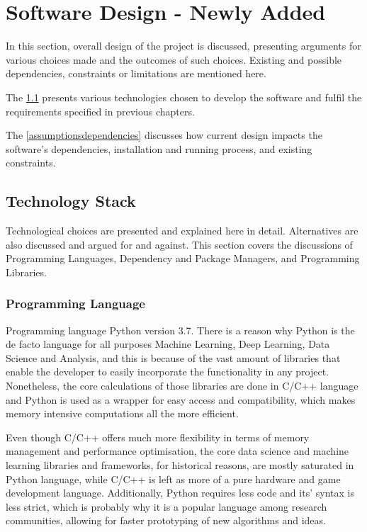 \section{Software Design - Newly Added}
    In this section, overall design of the project is discussed, presenting arguments for various choices made and the outcomes of such choices. Existing and possible dependencies, constraints or limitations are mentioned here.
    
    The \cref{techstack} presents various technologies chosen to develop the software and fulfil the requirements specified in previous chapters.
    
    The \cref{assumptionsdependencies} discusses how current design impacts the software's dependencies, installation and running process, and existing constraints.
    
    \subsection{Technology Stack} \label{techstack}
        Technological choices are presented and explained here in detail. Alternatives are also discussed and argued for and against. This section covers the discussions of Programming Languages, Dependency and Package Managers, and Programming Libraries.
        
        \subsubsection{Programming Language}
            Programming language Python version 3.7. There is a reason why Python is the de facto language for all purposes Machine Learning, Deep Learning, Data Science and Analysis, and this is because of the vast amount of libraries that enable the developer to easily incorporate the functionality in any project. Nonetheless, the core calculations of those libraries are done in C/C++ language and Python is used as a wrapper for easy access and compatibility, which makes memory intensive computations all the more efficient. 
            
            Even though C/C++ offers much more flexibility in terms of memory management and performance optimisation, the core data science and machine learning libraries and frameworks, for historical reasons, are mostly saturated in Python language, while C/C++ is left as more of a pure hardware and game development language. Additionally, Python requires less code and its' syntax is less strict, which is probably why it is a popular language among research communities, allowing for faster prototyping of new algorithms and ideas.
            
